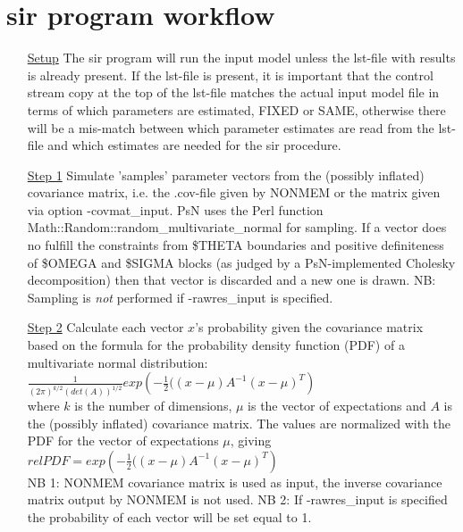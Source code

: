 \section{sir program workflow}
\begin{itemize}
\item[\underline{Setup}] The sir program will run the input model unless the lst-file with results is already present. If the lst-file is present, it
is important that the control stream copy at the top of the lst-file matches the
actual input model file in terms of which parameters are estimated, 
FIXED or SAME, otherwise there will be a mis-match between which parameter estimates are read from the
lst-file and which estimates are needed for the sir procedure.
\item[\underline{Step 1}] Simulate 'samples' parameter vectors from the 
(possibly inflated)
covariance matrix, i.e. the .cov-file given by NONMEM 
or the matrix given via option -covmat\_input. PsN uses the Perl function\\ 
Math::Random::random\_multivariate\_normal
for sampling. If a vector does no fulfill the constraints from \$THETA boundaries
and positive definiteness of \$OMEGA and
\$SIGMA blocks (as judged by a PsN-implemented Cholesky decomposition) 
then that vector is 
discarded and a new one is drawn.
NB: Sampling is \emph{not} performed if -rawres\_input is specified.
\item[\underline{Step 2}] Calculate each vector $x$’s probability 
given the covariance matrix based on the formula for the probability 
density function (PDF) of a multivariate normal distribution:\\
\begin{math}
\frac{1}{\left(2\pi\right)^{k/2}\left(det\left(A\right)\right)^{1/2}} exp\left(-\frac{1}{2}(\left(x-\mu\right)A^{-1} \left(x-\mu\right)^T\right)
\end{math}
\\
where $k$ is the number of dimensions, 
$\mu$ is the vector of expectations and $A$ is the (possibly inflated) covariance matrix.
The values are normalized with the PDF for the vector of expectations $\mu$, giving\\
\begin{math}
relPDF=exp\left(-\frac{1}{2}(\left(x-\mu\right)A^{-1} \left(x-\mu\right)^T\right)
\end{math}
\\
NB 1: NONMEM covariance matrix is used as input, the inverse covariance matrix
output by NONMEM is not used.
NB 2: If -rawres\_input is specified the probability of each vector will be set equal to 1.

\end{itemize}
